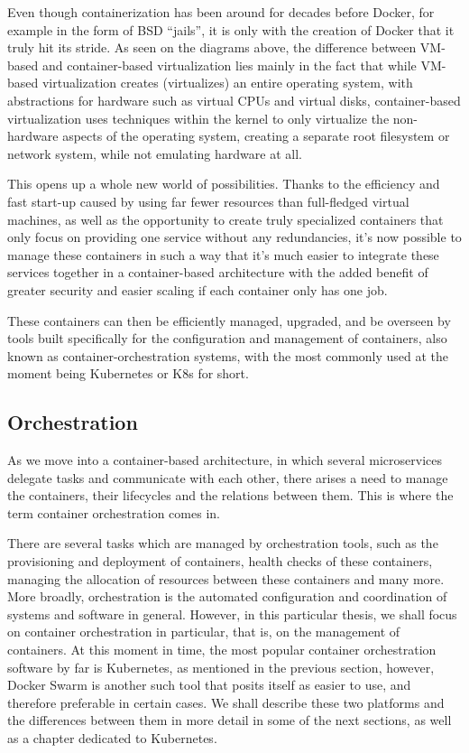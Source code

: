\documentclass[thesis=B,english]{FITthesis}[2019/12/23]
\begin{document}
Even though containerization has been around for decades before Docker, for example in the form of BSD “jails”, it is only with the creation of Docker that it truly hit its stride. As seen on the diagrams above, the difference between VM-based and container-based virtualization lies mainly in the fact that while VM-based virtualization creates (virtualizes) an entire operating system, with abstractions for hardware such as virtual CPUs and virtual disks, container-based virtualization uses techniques within the kernel to only virtualize the non-hardware aspects of the operating system, creating a separate root filesystem or network system, while not emulating hardware at all. \cite{virtualization}

This opens up a whole new world of possibilities. Thanks to the efficiency and fast start-up caused by using far fewer resources than full-fledged virtual machines, as well as the opportunity to create truly specialized containers that only focus on providing one service without any redundancies, it’s now possible to manage these containers in such a way that it’s much easier to integrate these services together in a container-based architecture with the added benefit of greater security and easier scaling if each container only has one job.

These containers can then be efficiently managed, upgraded, and be overseen by tools built specifically for the configuration and management of containers, also known as container-orchestration systems, with the most commonly used at the moment being Kubernetes or K8s for short.


\subsection{Orchestration}

As we move into a container-based architecture, in which several microservices delegate tasks and communicate with each other, there arises a need to manage the containers, their lifecycles and the relations between them. This is where the term container orchestration comes in.

There are several tasks which are managed by orchestration tools, such as the provisioning and deployment of containers, health checks of these containers, managing the allocation of resources between these containers and many more. More broadly, orchestration is the automated configuration and coordination of systems and software in general. However, in this particular thesis, we shall focus on container orchestration in particular, that is, on the management of containers. At this moment in time, the most popular container orchestration software by far is Kubernetes, as mentioned in the previous section, however, Docker Swarm is another such tool that posits itself as easier to use, and therefore preferable in certain cases. \cite{docker-orchestration} We shall describe these two platforms and the differences between them in more detail in some of the next sections, as well as a chapter dedicated to Kubernetes.
\end{document}
